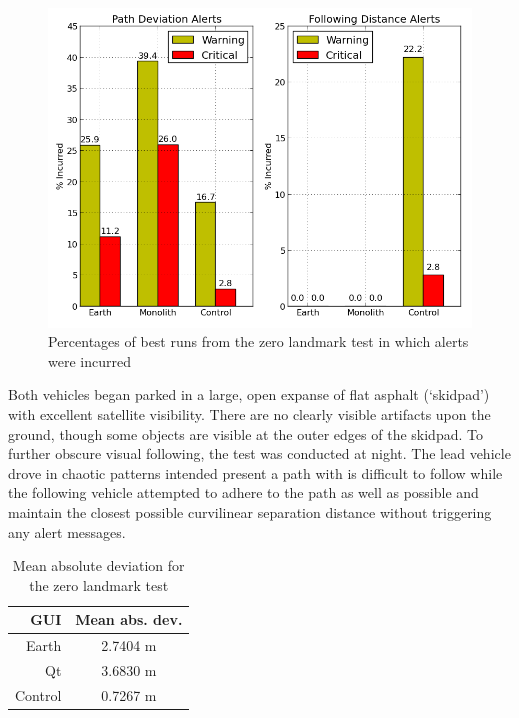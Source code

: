 \documentclass[twocolumn,10pt]{article}
\begin{document}
    \begin{figure}[ht] \centering
      \includegraphics[width=\columnwidth]{../graphics/zero_landmark_alert_percents.png}
      \caption{Percentages of best runs from the zero landmark test in which alerts were incurred}
      \label{fig:zero_landmark_alert_percents}
    \end{figure}

    Both vehicles began parked in a large, open expanse of flat asphalt (`skidpad') with excellent satellite visibility.  There are no clearly visible artifacts upon the ground, though some objects are visible at the outer edges of the skidpad.  To further obscure visual following, the test was conducted at night.  The lead vehicle drove in chaotic patterns intended present a path with is difficult to follow while the following vehicle attempted to adhere to the path as well as possible and maintain the closest possible curvilinear separation distance without triggering any alert messages.

    \begin{table}[htbp] \centering \caption{Mean absolute deviation for the zero landmark test}
    \begin{tabular}{r|c} 
        GUI&    Mean abs. dev. \\ \hline\hline
        Earth&      2.7404 m \\
        Qt&   3.6830 m \\
        Control&    0.7267 m \\ \hline   
    \end{tabular} \label{tab:zero_dev_mean} \end{table}
\end{document}
